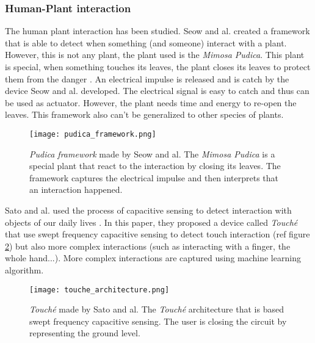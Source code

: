 \subsubsection{Human-Plant interaction}

The human plant interaction has been studied. Seow and al. \cite{seowPudicaFrameworkDesigning2022}
created a framework that is able to detect when something (and someone) interact with a plant.
However, this is not any plant, the plant used is the \textit{Mimosa Pudica}. This plant is special,
when something touches its leaves, the plant closes its leaves to protect them from the danger \cite{volkovMimosaPudicaElectrical2010}.
An electrical impulse is released and is catch by the device Seow and al. developed. The electrical
signal is easy to catch and thus can be used as actuator. However, the plant needs time and energy
to re-open the leaves. This framework also can't be generalized to other species of plants.

\begin{figure}[h!]
    \centering
    \texttt{[image: pudica\_framework.png]}
    \caption{\textit{Pudica framework} made by Seow and al. The \textit{Mimosa Pudica} is a
        special plant that react to the interaction by closing its leaves. The framework captures the electrical impulse and then interprets that an interaction happened.}
    \vspace{0.1cm}
    \label{fig:pudica_framework}
\end{figure}

Sato and al. used the process of capacitive sensing to detect interaction with objects of our daily lives \cite{satoToucheEnhancingTouch2012}.
In this paper, they proposed a device called \textit{Touché} that use swept frequency capacitive sensing to detect touch interaction (ref figure \ref{fig:touche_architecture}) but also more complex interactions (such as interacting with a finger, the whole hand...). More complex interactions are captured using machine learning algorithm.

\begin{figure}[h!]
    \centering
    \texttt{[image: touche\_architecture.png]}
    \caption{\textit{Touché} made by Sato and al. The \textit{Touché} architecture that is based swept frequency capacitive sensing. The user is closing the circuit by representing the ground level.}
    \vspace{0.1cm}
    \label{fig:touche_architecture}
\end{figure}



